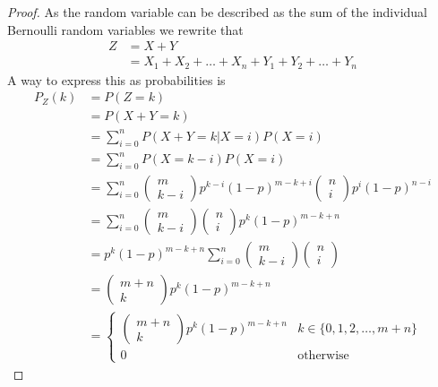 \begin{proof}
  As the random variable can be described as the sum of the individual Bernoulli random variables we rewrite that
  \begin{align*}
      Z&=X+Y \\
       &=X_{1}+X_{2}+\ldots+X_{n}+Y_{1}+Y_{2}+\ldots+Y_{n}
  \end{align*}
  A way to express this as probabilities is
  \begin{align*}
      P_{Z}(k)&=P(Z=k) \\
              &=P(X+Y=k) \\
              &=\sum_{i=0}^{n}P(X+Y=k|X=i)P(X=i) \\
              &=\sum_{i=0}^{n}P(X=k-i)P(X=i) \\
              &=\sum_{i=0}^{n}\begin{pmatrix}m\\k-i\end{pmatrix}p^{k-i}(1-p)^{m-k+i}\begin{pmatrix}n\\i\end{pmatrix}p^{i}(1-p)^{n-i} \\
              &=\sum_{i=0}^{n}\begin{pmatrix}m\\k-i\end{pmatrix}\begin{pmatrix}n\\i\end{pmatrix}p^{k}(1-p)^{m-k+n} \\
              &=p^{k}(1-p)^{m-k+n}\sum_{i=0}^{n}\begin{pmatrix}m\\k-i\end{pmatrix}\begin{pmatrix}n\\i\end{pmatrix} \\
              &=\begin{pmatrix}m+n\\k\end{pmatrix}p^{k}(1-p)^{m-k+n} \\
              &=\begin{cases}\begin{pmatrix}m+n\\k\end{pmatrix}p^{k}(1-p)^{m-k+n} & k\in\{0,1,2,\ldots,m+n\} \\ 0 & \text{otherwise}\end{cases}
  \end{align*}
\end{proof}
